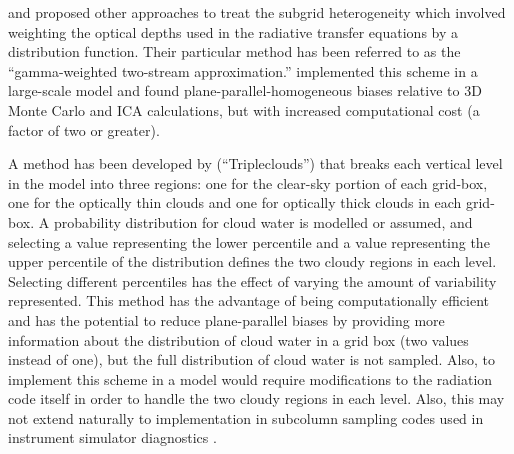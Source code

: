 \documentclass{article}
\begin{document}
\cite{barker_1996} and \cite{oreopoulos_and_barker_1999} proposed other approaches to treat the subgrid heterogeneity which involved weighting the optical depths used in the radiative transfer equations by a distribution function. Their particular method has been referred to as the ``gamma-weighted two-stream approximation.'' \cite{oreopoulos_and_barker_1999} implemented this scheme in a large-scale model and found plane-parallel-homogeneous biases relative to 3D Monte Carlo and ICA calculations, but with increased computational cost (a factor of two or greater).

A method has been developed by \cite{shonk_and_hogan_2008} (``Tripleclouds'') that breaks each vertical level in the model into three regions: one for the clear-sky portion of each grid-box, one for the optically thin clouds and one for optically thick clouds in each grid-box. A probability distribution for cloud water is modelled or assumed, and selecting a value representing the lower percentile and a value representing the upper percentile of the distribution defines the two cloudy regions in each level. Selecting different percentiles has the effect of varying the amount of variability represented. This method has the advantage of being computationally efficient and has the potential to reduce plane-parallel biases by providing more information about the distribution of cloud water in a grid box (two values instead of one), but the full distribution of cloud water is not sampled. Also, to implement this scheme in a model would require modifications to the radiation code itself in order to handle the two cloudy regions in each level. Also, this may not extend naturally to implementation in subcolumn sampling codes used in instrument simulator diagnostics \citep{klein_and_jakob_1999}.
\end{document}
